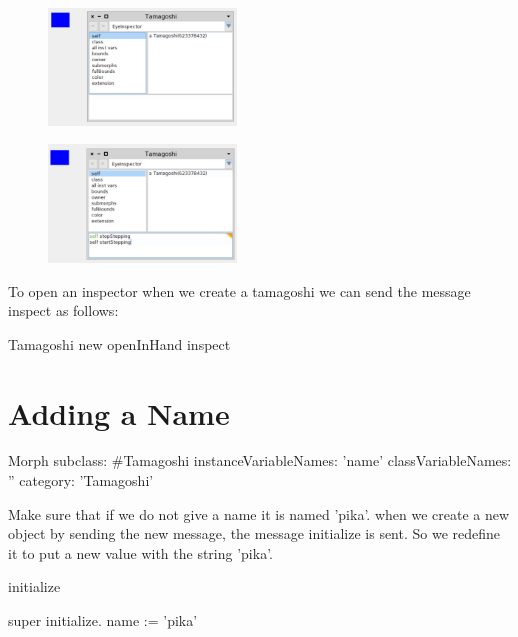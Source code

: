 \documentclass[a4paper,10pt,twoside]{book}
\begin{document}
\begin{figure}
\begin{center}
\includegraphics[width=5cm]{figures/TamagoshiWithInspector}
\caption{\label{fig:tomastate}}
\end{center}
\end{figure}


\begin{figure}
\begin{center}
\includegraphics[width=5cm]{figures/TamaWithInspectorAndInstruction}
\caption{\label{fig:tomastate}}
\end{center}
\end{figure}


To open an inspector when we create a tamagoshi we can send the message inspect as follows: 

\begin{code}{}
Tamagoshi new openInHand inspect
\end{code}

\section{Adding a Name}




\begin{code}{}
Morph subclass: #Tamagoshi
	instanceVariableNames: 'name'
	classVariableNames: ''
	category: 'Tamagoshi'
\end{code}



Make sure that if we do not give a name it is named 'pika'.  when we create a new object by sending  the new message, the message initialize is sent. So we redefine it to put a new value with the string 'pika'. 

\begin{code}{}
initialize

	super initialize. 
	name := 'pika'
\end{code}
\end{document}
